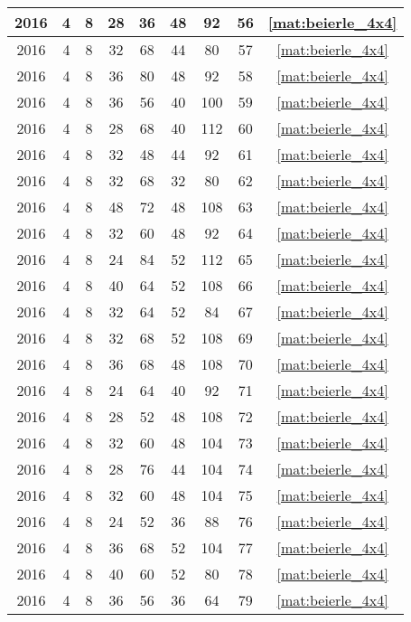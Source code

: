 \begin{longtable}{|c|c|c|c|c|c|c|c|c|}
2016 & 4 & 8 & 28 & 36 & 48 & 92 & 56 & \eqref{mat:beierle_4x4} \\ \hline 
2016 & 4 & 8 & 32 & 68 & 44 & 80 & 57 & \eqref{mat:beierle_4x4} \\ \hline 
2016 & 4 & 8 & 36 & 80 & 48 & 92 & 58 & \eqref{mat:beierle_4x4} \\ \hline 
2016 & 4 & 8 & 36 & 56 & 40 & 100 & 59 & \eqref{mat:beierle_4x4} \\ \hline 
2016 & 4 & 8 & 28 & 68 & 40 & 112 & 60 & \eqref{mat:beierle_4x4} \\ \hline 
2016 & 4 & 8 & 32 & 48 & 44 & 92 & 61 & \eqref{mat:beierle_4x4} \\ \hline 
2016 & 4 & 8 & 32 & 68 & 32 & 80 & 62 & \eqref{mat:beierle_4x4} \\ \hline 
2016 & 4 & 8 & 48 & 72 & 48 & 108 & 63 & \eqref{mat:beierle_4x4} \\ \hline 
2016 & 4 & 8 & 32 & 60 & 48 & 92 & 64 & \eqref{mat:beierle_4x4} \\ \hline 
2016 & 4 & 8 & 24 & 84 & 52 & 112 & 65 & \eqref{mat:beierle_4x4} \\ \hline 
2016 & 4 & 8 & 40 & 64 & 52 & 108 & 66 & \eqref{mat:beierle_4x4} \\ \hline 
2016 & 4 & 8 & 32 & 64 & 52 & 84 & 67 & \eqref{mat:beierle_4x4} \\ \hline 
2016 & 4 & 8 & 32 & 68 & 52 & 108 & 69 & \eqref{mat:beierle_4x4} \\ \hline 
2016 & 4 & 8 & 36 & 68 & 48 & 108 & 70 & \eqref{mat:beierle_4x4} \\ \hline 
2016 & 4 & 8 & 24 & 64 & 40 & 92 & 71 & \eqref{mat:beierle_4x4} \\ \hline 
2016 & 4 & 8 & 28 & 52 & 48 & 108 & 72 & \eqref{mat:beierle_4x4} \\ \hline 
2016 & 4 & 8 & 32 & 60 & 48 & 104 & 73 & \eqref{mat:beierle_4x4} \\ \hline 
2016 & 4 & 8 & 28 & 76 & 44 & 104 & 74 & \eqref{mat:beierle_4x4} \\ \hline 
2016 & 4 & 8 & 32 & 60 & 48 & 104 & 75 & \eqref{mat:beierle_4x4} \\ \hline 
2016 & 4 & 8 & 24 & 52 & 36 & 88 & 76 & \eqref{mat:beierle_4x4} \\ \hline 
2016 & 4 & 8 & 36 & 68 & 52 & 104 & 77 & \eqref{mat:beierle_4x4} \\ \hline 
2016 & 4 & 8 & 40 & 60 & 52 & 80 & 78 & \eqref{mat:beierle_4x4} \\ \hline 
2016 & 4 & 8 & 36 & 56 & 36 & 64 & 79 & \eqref{mat:beierle_4x4} \\ \hline 

\end{longtable}
